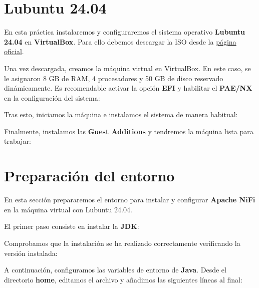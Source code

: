 \documentclass{../../miPlantilla}
\begin{document}
\maketitle

\section{Lubuntu 24.04}
En esta práctica instalaremos y configuraremos el sistema operativo \textbf{Lubuntu 24.04} en \textbf{VirtualBox}.
Para ello debemos descargar la ISO desde la \href{https://cdimage.ubuntu.com/lubuntu/releases/noble/release/lubuntu-24.04.3-desktop-amd64.iso}{página oficial}.  

Una vez descargada, creamos la máquina virtual en VirtualBox. En este caso, se le asignaron 8 GB de RAM, 4 procesadores y 50 GB de disco reservado dinámicamente.  
Es recomendable activar la opción \textbf{EFI} y habilitar el \textbf{PAE/NX} en la configuración del sistema:


Tras esto, iniciamos la máquina e instalamos el sistema de manera habitual:


Finalmente, instalamos las \textbf{Guest Additions} y tendremos la máquina lista para trabajar:


\newpage

\section{Preparación del entorno}
En esta sección prepararemos el entorno para instalar y configurar \textbf{Apache NiFi} en la máquina virtual con Lubuntu 24.04.  

El primer paso consiste en instalar la \textbf{JDK}:


Comprobamos que la instalación se ha realizado correctamente verificando la versión instalada:


A continuación, configuramos las variables de entorno de \textbf{Java}. Desde el directorio \textbf{home}, editamos el archivo  y añadimos las siguientes líneas al final:
\end{document}
